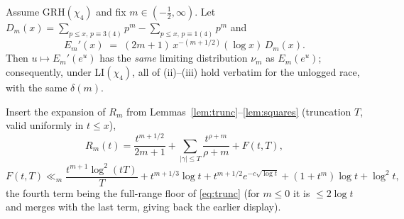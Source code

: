 %

\begin{proposition}\label{prop:unlogged}
Assume GRH$(\chi_4)$ and fix $m\in(-\tfrac12,\infty)$. Let
$D_m(x)=\sum_{p\le x,\,p\equiv3(4)}p^m-\sum_{p\le x,\,p\equiv1(4)}p^m$
and
\[
E_m'(x)\;=\;(2m+1)\,x^{-(m+1/2)}(\log x)\,D_m(x).
\]
Then $u\mapsto E_m'(e^u)$ has the \emph{same} limiting distribution
$\nu_m$ as $E_m(e^u)$; consequently, under LI$(\chi_4)$, all of
(ii)--(iii) hold verbatim for the unlogged race, with the same
$\delta(m)$.
\end{proposition}


Insert the expansion of $R_m$ from
Lemmas~\ref{lem:trunc}--\ref{lem:squares}
(truncation $T$, valid uniformly in $t\le x$),
\[
R_m(t)=\frac{t^{m+1/2}}{2m+1}
+\sum_{|\gamma|\le T}\frac{t^{\rho+m}}{\rho+m}+F(t,T),
\]
\[
F(t,T)\ll_m \frac{t^{m+1}\log^2(tT)}{T}+t^{m+1/3}\log t
+t^{m+1/2}e^{-c\sqrt{\log t}}+(1+t^m)\log t+\log^2 t ,
\]
the fourth term being the full-range floor of \eqref{eq:trunc}
(for $m\le0$ it is $\le2\log t$ and merges with the last term, giving
back the earlier display).


